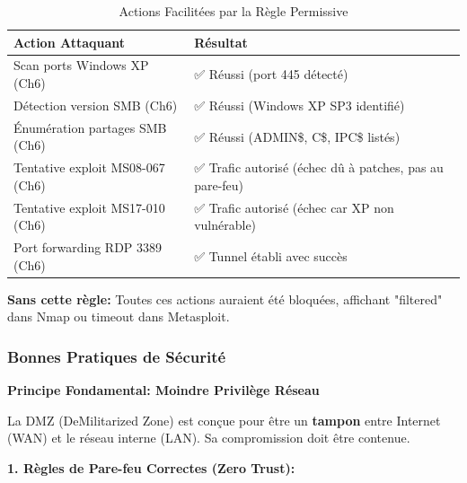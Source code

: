 \documentclass[12pt,a4paper,openany]{report}
\begin{document}
	\begin{table}[H]
		\centering
		\small
		\renewcommand{\arraystretch}{1.3}
		\begin{tabular}{p{6cm} p{7cm}}
			\hline
			\textbf{Action Attaquant} & \textbf{Résultat} \\
			\hline
			Scan ports Windows XP (Ch6) & 
			✅ Réussi (port 445 détecté) \\
			
			Détection version SMB (Ch6) & 
			✅ Réussi (Windows XP SP3 identifié) \\
			
			Énumération partages SMB (Ch6) & 
			✅ Réussi (ADMIN\$, C\$, IPC\$ listés) \\
			
			Tentative exploit MS08-067 (Ch6) & 
			✅ Trafic autorisé (échec dû à patches, pas au pare-feu) \\
			
			Tentative exploit MS17-010 (Ch6) & 
			✅ Trafic autorisé (échec car XP non vulnérable) \\
			
			Port forwarding RDP 3389 (Ch6) & 
			✅ Tunnel établi avec succès \\
			\hline
		\end{tabular}
		\caption{Actions Facilitées par la Règle Permissive}
	\end{table}
	
	\textbf{Sans cette règle:} Toutes ces actions auraient été bloquées, 
	affichant "filtered" dans Nmap ou timeout dans Metasploit.
	
	\subsubsection{Bonnes Pratiques de Sécurité}
	
	\textbf{Principe Fondamental: Moindre Privilège Réseau}
	
	La DMZ (DeMilitarized Zone) est conçue pour être un \textbf{tampon} 
	entre Internet (WAN) et le réseau interne (LAN). Sa compromission doit 
	être contenue.
	
	\textbf{1. Règles de Pare-feu Correctes (Zero Trust):}
	
\end{document}
